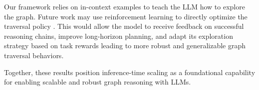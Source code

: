 Our framework relies on in-context examples to teach the LLM how to explore the graph. Future work may use reinforcement learning to directly optimize the traversal policy \citep{gulcehre2023reinforcedselftrainingrestlanguage, zhang2024rest}. This would allow the model to receive feedback on successful reasoning chains, improve long-horizon planning, and adapt its exploration strategy based on task rewards leading to more robust and generalizable graph traversal behaviors.

Together, these results position inference-time scaling as a foundational capability for enabling scalable and robust graph reasoning with LLMs. 